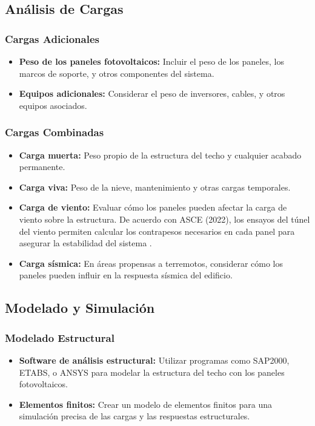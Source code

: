\documentclass{article}
\begin{document}
\subsection*{Análisis de Cargas}

\subsubsection*{Cargas Adicionales}
\begin{itemize}
    \item \textbf{Peso de los paneles fotovoltaicos:} Incluir el peso de los paneles, los marcos de soporte, y otros componentes del sistema.
    \item \textbf{Equipos adicionales:} Considerar el peso de inversores, cables, y otros equipos asociados.
\end{itemize}

\subsubsection*{Cargas Combinadas}
\begin{itemize}
    \item \textbf{Carga muerta:} Peso propio de la estructura del techo y cualquier acabado permanente.
    \item \textbf{Carga viva:} Peso de la nieve, mantenimiento y otras cargas temporales.
    \item \textbf{Carga de viento:} Evaluar cómo los paneles pueden afectar la carga de viento sobre la estructura. De acuerdo con ASCE (2022), los ensayos del túnel del viento permiten calcular los contrapesos necesarios en cada panel para asegurar la estabilidad del sistema \cite{idaepctcon}.
    \item \textbf{Carga sísmica:} En áreas propensas a terremotos, considerar cómo los paneles pueden influir en la respuesta sísmica del edificio.
\end{itemize}

\subsection*{Modelado y Simulación}

\subsubsection*{Modelado Estructural}
\begin{itemize}
    \item \textbf{Software de análisis estructural:} Utilizar programas como SAP2000, ETABS, o ANSYS para modelar la estructura del techo con los paneles fotovoltaicos.
    \item \textbf{Elementos finitos:} Crear un modelo de elementos finitos para una simulación precisa de las cargas y las respuestas estructurales.
\end{itemize}
\end{document}
